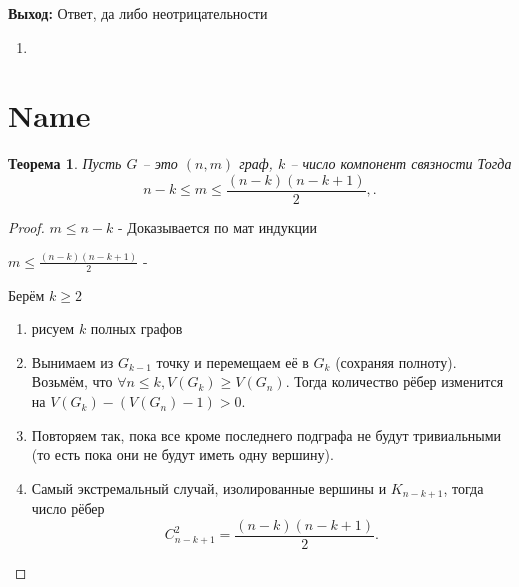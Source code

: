 \documentclass[a4paper, 12pt]{article}
\newtheorem*{theorem*}{Теорема}
\theoremstyle{definition}
\theoremstyle{definition}
\renewcommand{\leq}{\leqslant}
\renewcommand{\geq}{\geqslant}
\begin{document}
  \textbf{Выход:} Ответ, да либо неотрицательности
  
  \begin{enumerate}
    \item 
  \end{enumerate}
  \section{Name}
  \begin{theorem*}
    Пусть $G$ -- это $(n,m)$ граф, $k$ -- число компонент связности
    Тогда
    $$n-k\leq{m}\leq\frac{(n-k)(n-k+1)}{2},.$$
  \end{theorem*}
  
  \begin{proof}
    $m\leq{n-k}$ - Доказывается по мат индукции
    
    $m\leq\frac{(n-k)(n-k+1)}{2}$ - 
    
    Берём $k\geq{2}$
    
    \begin{enumerate}
      \item рисуем $k$ полных графов
      
      \item Вынимаем из $G_{k-1}$ точку и перемещаем её в $G_k$ (сохраняя полноту). Возьмём, что $\forall n\le k, V(G_k)\geq V(G_n)$. Тогда количество рёбер изменится на $V(G_k)-(V(G_n)-1) > 0$.
      \item Повторяем так, пока все кроме последнего подграфа не будут тривиальными (то есть пока они не будут иметь одну вершину).
      \item Самый экстремальный случай, изолированные вершины и $K_{n-k+1}$, тогда число рёбер $$C^2_{n-k+1}=\frac{(n-k)(n-k+1)}{2}.$$ 
    \end{enumerate}
  \end{proof}
  
\end{document}
